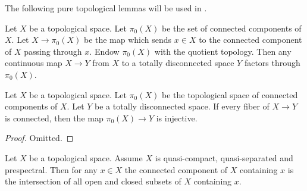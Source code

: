 The following pure topological lemmas will be used in .

\begin{definition}
  \label{def:pi0-to-totally-disconnected}
  \mathlibok
  Let \(X\) be a topological space. Let \(\pi_0(X)\) be the set of connected components of \(X\). Let \(X \to \pi_0(X)\) be the map which sends \(x \in X\) to the connected component of \(X\) passing through \(x\). Endow \(\pi_0(X)\) with the quotient topology. Then %
  any continuous map \(X \to Y\) from \(X\) to a totally disconnected space \(Y\) factors through \(\pi_0(X)\).
\end{definition}

\begin{lemma}
  \label{thm:pi0-to-totally-disconnected-injective}
  \leanok
  Let \(X\) be a topological space. Let \(\pi_0(X)\) be the topological space of connected components of \(X\). Let \(Y\) be a totally disconnected space. If every fiber of \(X \to Y\) is connected, then the map \(\pi_0(X) \to Y\) is injective.
\end{lemma}

\begin{proof}
  \leanok
  Omitted.
\end{proof}

\begin{lemma}
  \label{thm:connected-component-intersection-closed-open}
  \leanok
  Let $X$ be a topological space. Assume $X$ is quasi-compact, quasi-separated
  and prespectral. Then for any $x \in X$ the connected component of $X$ containing $x$ is
  the intersection of all open and closed subsets of $X$ containing $x$.
\end{lemma}

